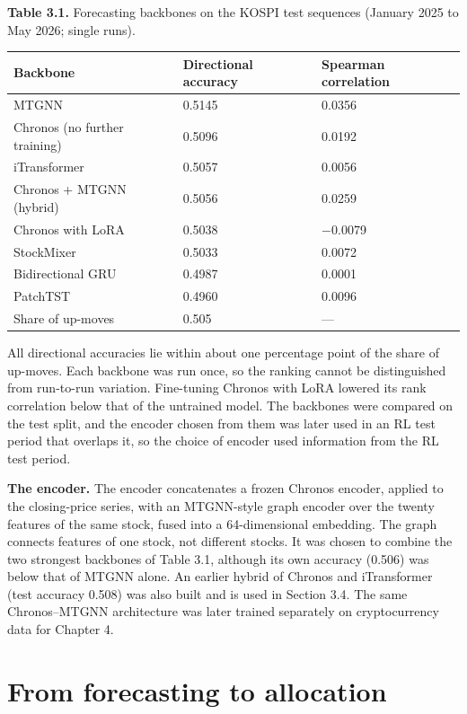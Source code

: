 \documentclass[12pt,a4paper]{report}
\begin{document}
\textbf{Table 3.1.} Forecasting backbones on the KOSPI test sequences
(January 2025 to May 2026; single runs).

{\small
\begin{longtable}[]{@{}lll@{}}
\toprule\noalign{}
Backbone & Directional accuracy & Spearman correlation \\
\midrule\noalign{}
\endhead
\bottomrule\noalign{}
\endlastfoot
MTGNN & 0.5145 & 0.0356 \\
Chronos (no further training) & 0.5096 & 0.0192 \\
iTransformer & 0.5057 & 0.0056 \\
Chronos + MTGNN (hybrid) & 0.5056 & 0.0259 \\
Chronos with LoRA & 0.5038 & −0.0079 \\
StockMixer & 0.5033 & 0.0072 \\
Bidirectional GRU & 0.4987 & 0.0001 \\
PatchTST & 0.4960 & 0.0096 \\
Share of up-moves & 0.505 & --- \\
\end{longtable}
}

All directional accuracies lie within about one percentage point of the
share of up-moves. Each backbone was run once, so the ranking cannot be
distinguished from run-to-run variation. Fine-tuning Chronos with LoRA
lowered its rank correlation below that of the untrained model. The
backbones were compared on the test split, and the encoder chosen from
them was later used in an RL test period that overlaps it, so the choice
of encoder used information from the RL test period.

\textbf{The encoder.} The encoder concatenates a frozen Chronos encoder,
applied to the closing-price series, with an MTGNN-style graph encoder
over the twenty features of the same stock, fused into a 64-dimensional
embedding. The graph connects features of one stock, not different
stocks. It was chosen to combine the two strongest backbones of Table
3.1, although its own accuracy (0.506) was below that of MTGNN alone. An
earlier hybrid of Chronos and iTransformer (test accuracy 0.508) was
also built and is used in Section 3.4. The same Chronos--MTGNN
architecture was later trained separately on cryptocurrency data for
Chapter 4.

\section{From forecasting to
allocation}\label{from-forecasting-to-allocation}
\end{document}
